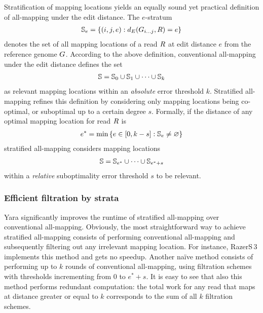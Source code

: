 Stratification of mapping locations yields an equally sound yet practical definition of all-mapping under the edit distance.
The $e$-stratum
\begin{eqnarray}
\mathbb{S}_e = \{ (i,j,e) : d_E({G}_{{i}\dots{j}},R) = e\}
\end{eqnarray}
denotes the set of all mapping locations of a read $R$ at edit distance $e$ from the reference genome $G$.
According to the above definition, conventional all-mapping under the edit distance defines the set
\begin{eqnarray}
\mathbb{S} = \mathbb{S}_0 \cup \mathbb{S}_1 \cup \dots \cup \mathbb{S}_k\label{eq:all-mapping}
\end{eqnarray}
as relevant mapping locations within an \emph{absolute} error threshold $k$.
Stratified all-mapping refines this definition by considering only mapping locations being co-optimal, or suboptimal up to a certain degree $s$.
Formally, if the distance of any optimal mapping location for read $R$ is
\begin{eqnarray}
e^* = \text{min} \,\{ e \in [0,k-s] : \mathbb{S}_e \neq \varnothing \}
\end{eqnarray}
stratified all-mapping considers mapping locations
\begin{eqnarray}
\mathbb{S} = \mathbb{S}_{e^*} \cup \dots \cup \mathbb{S}_{e^*+s}\label{eq:strata-mapping}
\end{eqnarray}
within a \emph{relative} suboptimality error threshold $s$ to be relevant.

\subsubsection{Efficient filtration by strata}

Yara significantly improves the runtime of stratified all-mapping over conventional all-mapping.
Obviously, the most straightforward way to achieve stratified all-mapping consists of performing conventional all-mapping and subsequently filtering out any irrelevant mapping location.
For instance, RazerS\,3 implements this method and gets no speedup.
Another na\"ive method consists of performing up to $k$ rounds of conventional all-mapping, using filtration schemes with thresholds incrementing from $0$ to $e^*+s$.
It is easy to see that also this method performs redundant computation: the total work for any read that maps at distance greater or equal to $k$ corresponds to the sum of all $k$ filtration schemes.

